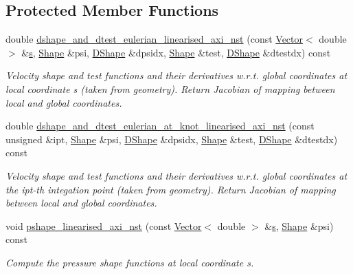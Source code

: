 \subsection*{Protected Member Functions}
\begin{DoxyCompactItemize}
\item 
double \hyperlink{classoomph_1_1LinearisedAxisymmetricQCrouzeixRaviartElement_a8b78103c409fbe8842b7a25510ad15fb}{dshape\+\_\+and\+\_\+dtest\+\_\+eulerian\+\_\+linearised\+\_\+axi\+\_\+nst} (const \hyperlink{classoomph_1_1Vector}{Vector}$<$ double $>$ \&\hyperlink{cfortran_8h_ab7123126e4885ef647dd9c6e3807a21c}{s}, \hyperlink{classoomph_1_1Shape}{Shape} \&psi, \hyperlink{classoomph_1_1DShape}{D\+Shape} \&dpsidx, \hyperlink{classoomph_1_1Shape}{Shape} \&test, \hyperlink{classoomph_1_1DShape}{D\+Shape} \&dtestdx) const
\begin{DoxyCompactList}\small\item\em Velocity shape and test functions and their derivatives w.\+r.\+t. global coordinates at local coordinate s (taken from geometry). Return Jacobian of mapping between local and global coordinates. \end{DoxyCompactList}\item 
double \hyperlink{classoomph_1_1LinearisedAxisymmetricQCrouzeixRaviartElement_a5de687eab43c1a20f7999983d8178347}{dshape\+\_\+and\+\_\+dtest\+\_\+eulerian\+\_\+at\+\_\+knot\+\_\+linearised\+\_\+axi\+\_\+nst} (const unsigned \&ipt, \hyperlink{classoomph_1_1Shape}{Shape} \&psi, \hyperlink{classoomph_1_1DShape}{D\+Shape} \&dpsidx, \hyperlink{classoomph_1_1Shape}{Shape} \&test, \hyperlink{classoomph_1_1DShape}{D\+Shape} \&dtestdx) const
\begin{DoxyCompactList}\small\item\em Velocity shape and test functions and their derivatives w.\+r.\+t. global coordinates at the ipt-\/th integation point (taken from geometry). Return Jacobian of mapping between local and global coordinates. \end{DoxyCompactList}\item 
void \hyperlink{classoomph_1_1LinearisedAxisymmetricQCrouzeixRaviartElement_aa04596314af005c461482c54e086f252}{pshape\+\_\+linearised\+\_\+axi\+\_\+nst} (const \hyperlink{classoomph_1_1Vector}{Vector}$<$ double $>$ \&\hyperlink{cfortran_8h_ab7123126e4885ef647dd9c6e3807a21c}{s}, \hyperlink{classoomph_1_1Shape}{Shape} \&psi) const
\begin{DoxyCompactList}\small\item\em Compute the pressure shape functions at local coordinate s. \end{DoxyCompactList}\item 

\end{DoxyCompactItemize}
